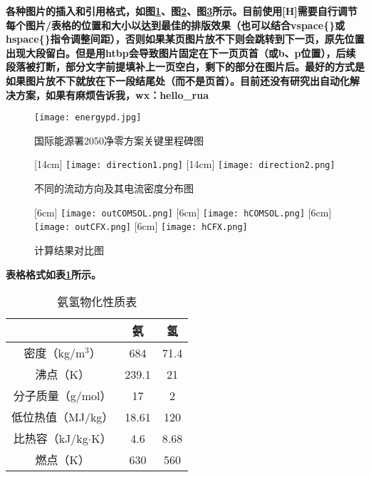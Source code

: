 \textbf{\color{blue} 各种图片的插入和引用格式，如图\ref{energypd}、图\ref{Yang2022}、图\ref{resultCCcloud}所示。目前使用[H]需要自行调节每个图片/表格的位置和大小以达到最佳的排版效果（也可以结合vspace\{\}或hspace\{\}指令调整间距），否则如果某页图片放不下则会跳转到下一页，原先位置出现大段留白。但是用htbp会导致图片固定在下一页页首（或b、p位置），后续段落被打断，部分文字前提填补上一页空白，剩下的部分在图片后。最好的方式是如果图片放不下就放在下一段结尾处（而不是页首）。目前还没有研究出自动化解决方案，如果有麻烦告诉我，wx：hello\_rua}
\begin{figure}[H]
	\centering
	\texttt{[image: energypd.jpg]}
	\caption{国际能源署2050净零方案关键里程碑图\cite{Chappell2021}}\label{energypd}
\end{figure}
\begin{figure}[H]
	\centering
	[14cm]{
		\texttt{[image: direction1.png]}
	}
	[14cm]{
		\texttt{[image: direction2.png]}
	}
	\caption{不同的流动方向及其电流密度分布图\cite{Yang2022}}\label{Yang2022}
\end{figure}
\begin{figure}[H]
	\centering
	[6cm]{
		\texttt{[image: outCOMSOL.png]}
	}
	[6cm]{
		\texttt{[image: hCOMSOL.png]}
	}
	[6cm]{
		\texttt{[image: outCFX.png]}
	}
	[6cm]{
		\texttt{[image: hCFX.png]}
	}
	\caption{计算结果对比图}\label{resultCCcloud}
\end{figure}
\textbf{\color{blue}表格格式如表\ref{Sasi2024}所示。}
\begin{table}[H]
	\centering
	\caption{氨氢物化性质表\cite{Sasi2024}}\label{Sasi2024}
	\begin{tabular}{ccc}
		\toprule%
		&氨&氢\\
		\midrule%
		密度（kg/m$^3$）&684&71.4\\
		沸点（K）&239.1&21\\
		分子质量（g/mol）&17&2\\
		低位热值（MJ/kg）&18.61&120\\
		比热容（kJ/kg$\cdot$K）&4.6&8.68\\
		燃点（K）&630&560\\
		\bottomrule%
	\end{tabular}
\end{table}